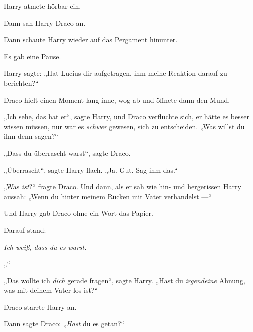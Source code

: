Harry atmete hörbar ein.

Dann sah Harry Draco an.

Dann schaute Harry wieder auf das Pergament hinunter.

Es gab eine Pause.

Harry sagte:
„Hat Lucius dir aufgetragen, ihm meine Reaktion darauf zu berichten?“

Draco hielt einen Moment lang inne, wog ab und öffnete dann den Mund.

„Ich sehe, das hat er“, sagte Harry, und Draco verfluchte sich, er hätte es besser wissen müssen, nur war es \emph{schwer} gewesen, sich zu entscheiden.
„Was willst du ihm denn sagen?“

„Dass du überrascht warst“, sagte Draco.

„Überrascht“, sagte Harry flach.
„Ja. Gut. Sag ihm das.“

„Was \emph{ist}?“ fragte Draco. Und dann, als er sah wie hin- und hergerissen Harry aussah:
„Wenn du hinter meinem Rücken mit Vater verhandelst —“

Und Harry gab Draco ohne ein Wort das Papier.

Darauf stand:

\emph{Ich weiß, dass du es warst.}

„\emph{}“

„Das wollte ich \emph{dich} gerade fragen“, sagte Harry.
„Hast du \emph{irgendeine} Ahnung, was mit deinem Vater los ist?“

Draco starrte Harry an.

Dann sagte Draco:
„\emph{Hast} du es getan?“


